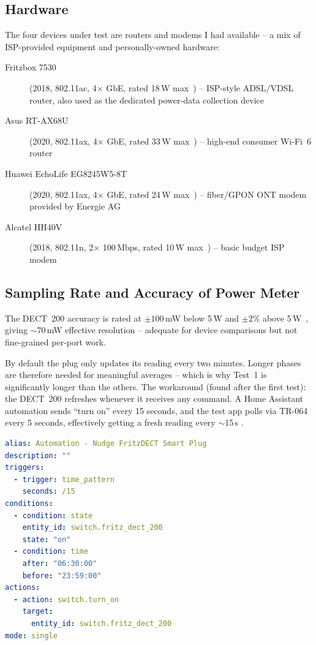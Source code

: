 \documentclass[a4paper,oneside,10pt,ngerman,english]{scrartcl}
\begin{document}
    \subsection{Hardware}
    The four devices under test are routers and modems I had available -- a mix of ISP-provided equipment and personally-owned hardware:
    \begin{description}
        \item[Fritzbox 7530] (2018, 802.11ac, 4$\times$ GbE, rated 18\,W max~\cite{bib:datasheet-fritzbox7530}) -- ISP-style ADSL/VDSL router, also used as the dedicated power-data collection device
        \item[Asus RT-AX68U] (2020, 802.11ax, 4$\times$ GbE, rated 33\,W max~\cite{bib:datasheet-asus-rtax68u}) -- high-end consumer Wi-Fi~6 router
        \item[Huawei EchoLife EG8245W5-8T] (2020, 802.11ax, 4$\times$ GbE, rated 24\,W max~\cite{bib:datasheet-huawei-eg8245}) -- fiber/GPON ONT modem provided by Energie AG
        \item[Alcatel HH40V] (2018, 802.11n, 2$\times$ 100\,Mbps, rated 10\,W max~\cite{bib:datasheet-alcatel-hh40v}) -- basic budget ISP modem
    \end{description}
    \subsection{Sampling Rate and Accuracy of Power Meter}
    The DECT~200 accuracy is rated at $\pm 100$\,mW below 5\,W and $\pm 2$\% above 5\,W~\cite{bib:dect200}, giving $\sim$70\,mW effective resolution -- adequate for device comparisons but not fine-grained per-port work.

    By default the plug only updates its reading every two minutes. Longer phases are therefore needed for meaningful averages -- which is why Test~1 is significantly longer than the others. The workaround (found after the first test): the DECT~200 refreshes whenever it receives any command. A Home Assistant automation sends ``turn on'' every 15 seconds, and the test app polls via TR-064 every 5 seconds, effectively getting a fresh reading every $\sim$15\,s \cite{ha-dect-workaround}.
    \begin{lstlisting}[language=yaml]
alias: Automation - Nudge FritzDECT Smart Plug
description: ""
triggers:
  - trigger: time_pattern
    seconds: /15
conditions:
  - condition: state
    entity_id: switch.fritz_dect_200
    state: "on"
  - condition: time
    after: "06:30:00"
    before: "23:59:00"
actions:
  - action: switch.turn_on
    target:
      entity_id: switch.fritz_dect_200
mode: single
    \end{lstlisting}
\end{document}
